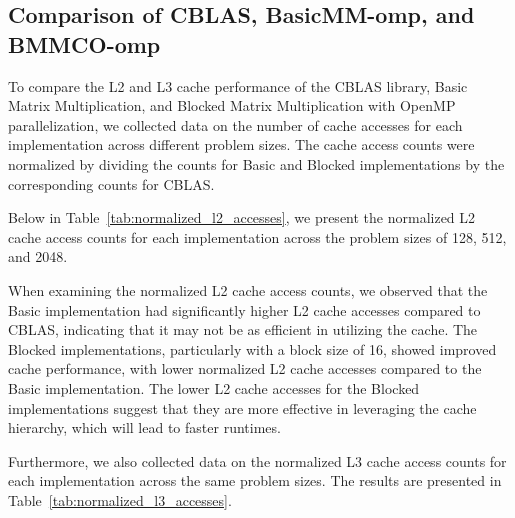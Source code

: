 \subsection{Comparison of CBLAS, BasicMM-omp, and BMMCO-omp}

To compare the L2 and L3 cache performance of the CBLAS library, Basic Matrix Multiplication, and Blocked Matrix Multiplication with OpenMP parallelization, we collected data on the number of cache accesses for each implementation across different problem sizes. The cache access counts were normalized by dividing the counts for Basic and Blocked implementations by the corresponding counts for CBLAS.

Below in Table~\ref{tab:normalized_l2_accesses}, we present the normalized L2 cache access counts for each implementation across the problem sizes of 128, 512, and 2048.

\begin{table}[H]
    \centering
    \caption{Normalized L2 cache accesses}
    \label{tab:normalized_l2_accesses}
    \small
\end{table}

When examining the normalized L2 cache access counts, we observed that the Basic implementation had significantly higher L2 cache accesses compared to CBLAS, indicating that it may not be as efficient in utilizing the cache. The Blocked implementations, particularly with a block size of 16, showed improved cache performance, with lower normalized L2 cache accesses compared to the Basic implementation. The lower L2 cache accesses for the Blocked implementations suggest that they are more effective in leveraging the cache hierarchy, which will lead to faster runtimes.

Furthermore, we also collected data on the normalized L3 cache access counts for each implementation across the same problem sizes. The results are presented in Table~\ref{tab:normalized_l3_accesses}.

